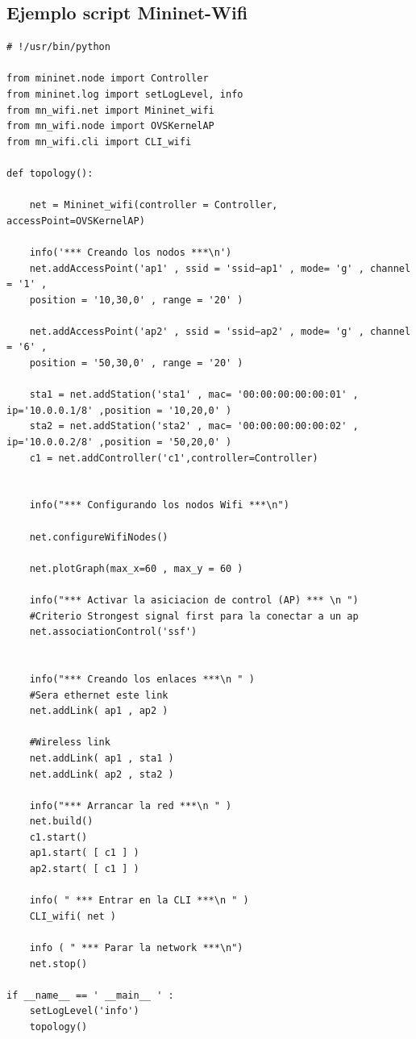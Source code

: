 \subsection{Ejemplo script Mininet-Wifi}
\begin{verbatim}
# !/usr/bin/python

from mininet.node import Controller
from mininet.log import setLogLevel, info
from mn_wifi.net import Mininet_wifi
from mn_wifi.node import OVSKernelAP
from mn_wifi.cli import CLI_wifi

def topology():

    net = Mininet_wifi(controller = Controller, accessPoint=OVSKernelAP)

    info('*** Creando los nodos ***\n')
    net.addAccessPoint('ap1' , ssid = 'ssid−ap1' , mode= 'g' , channel = '1' ,
    position = '10,30,0' , range = '20' )
    
    net.addAccessPoint('ap2' , ssid = 'ssid−ap2' , mode= 'g' , channel = '6' ,
    position = '50,30,0' , range = '20' )
    
    sta1 = net.addStation('sta1' , mac= '00:00:00:00:00:01' , ip='10.0.0.1/8' ,position = '10,20,0' )
    sta2 = net.addStation('sta2' , mac= '00:00:00:00:00:02' , ip='10.0.0.2/8' ,position = '50,20,0' )
    c1 = net.addController('c1',controller=Controller)


    info("*** Configurando los nodos Wifi ***\n")

    net.configureWifiNodes()

    net.plotGraph(max_x=60 , max_y = 60 )
    
    info("*** Activar la asiciacion de control (AP) *** \n ")
    #Criterio Strongest signal first para la conectar a un ap 
    net.associationControl('ssf')


    info("*** Creando los enlaces ***\n " )
    #Sera ethernet este link 
    net.addLink( ap1 , ap2 )

    #Wireless link 
    net.addLink( ap1 , sta1 )
    net.addLink( ap2 , sta2 )

    info("*** Arrancar la red ***\n " )
    net.build()
    c1.start()
    ap1.start( [ c1 ] )
    ap2.start( [ c1 ] )

    info( " *** Entrar en la CLI ***\n " )
    CLI_wifi( net )

    info ( " *** Parar la network ***\n")
    net.stop()

if __name__ == ' __main__ ' :
    setLogLevel('info')
    topology()
\end{verbatim}
\newpage

